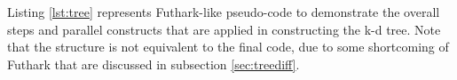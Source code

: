 		


Listing \ref{lst:tree} represents Futhark-like pseudo-code to demonstrate the overall steps and parallel constructs that are applied in constructing the k-d tree. Note that the structure is not equivalent to the final code, due to some shortcoming of Futhark that are discussed in subsection \ref{sec:treediff}. 


